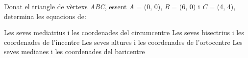 \begin{mylist}
			
	\exer  \hot Donat el triangle de vèrtexs \textit{ABC}, essent \textit{A} = (0, 0), \textit{B} = (6, 0) i \textit{C} = (4, 4), determina les equacions de:
	\begin{tasks}
		\task  Les seves mediatrius i les coordenades del circumcentre
		\task  Les seves bisectrius i les coordenades de l'incentre
		\task  Les seves altures i les coordenades de l'ortocentre
		\task  Les seves medianes i les coordenades del baricentre
	\end{tasks}

\end{mylist}



